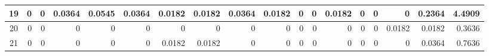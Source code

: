 \begin{table}[ht]
\begin{adjustbox}{width = \textwidth, center}
\begin{tabular}{|c|r|r|r|r|r|r|r|r|r|r|r|r|r|r|r|r|r|}
            \cellcolor[HTML]{CFE2F3}19                           & \cellcolor[HTML]{FFFFFF}0                      & \cellcolor[HTML]{FFFFFF}0                      & \cellcolor[HTML]{8FD2B1}0.0364                 & \cellcolor[HTML]{57BB8A}0.0545                 & \cellcolor[HTML]{8FD2B1}0.0364                 & \cellcolor[HTML]{C7E9D8}0.0182                 & \cellcolor[HTML]{C7E9D8}0.0182                 & \cellcolor[HTML]{8FD2B1}0.0364                  & \cellcolor[HTML]{C7E9D8}0.0182                  & \cellcolor[HTML]{FFFFFF}0                       & \cellcolor[HTML]{FFFFFF}0                       & \cellcolor[HTML]{C7E9D8}0.0182                  & \cellcolor[HTML]{FFFFFF}0                       & \cellcolor[HTML]{FFFFFF}0                       & \cellcolor[HTML]{FFFFFF}0                       & \cellcolor[HTML]{D9D2E9}0.2364                                                        & \cellcolor[HTML]{D9D2E9}4.4909                                                            \\ \hline
            \rowcolor[HTML]{FFFFFF} 
            \cellcolor[HTML]{CFE2F3}20                           & 0                                              & 0                                              & 0                                              & 0                                              & 0                                              & 0                                              & 0                                              & 0                                               & 0                                               & 0                                               & 0                                               & 0                                               & 0                                               & 0                                               & \cellcolor[HTML]{C7E9D8}0.0182                  & \cellcolor[HTML]{D9D2E9}0.0182                                                        & \cellcolor[HTML]{D9D2E9}0.3636                                                            \\ \hline
            \rowcolor[HTML]{FFFFFF} 
            \cellcolor[HTML]{CFE2F3}21                           & 0                                              & 0                                              & 0                                              & 0                                              & 0                                              & \cellcolor[HTML]{C7E9D8}0.0182                 & \cellcolor[HTML]{C7E9D8}0.0182                 & 0                                               & 0                                               & 0                                               & 0                                               & 0                                               & 0                                               & 0                                               & 0                                               & \cellcolor[HTML]{D9D2E9}0.0364                                                        & \cellcolor[HTML]{D9D2E9}0.7636                                                            \\ \hline

\end{tabular}
\end{adjustbox}
\end{table}
